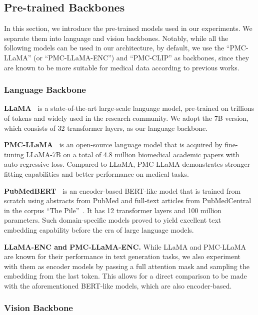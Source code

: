 \documentclass{article}
\begin{document}
\subsection{Pre-trained Backbones}
\label{sec:Pre-trained Models}

In this section, we introduce the pre-trained models used in our experiments. We separate them into language and vision backbones. Notably, while all the following models can be used in our architecture, by default, 
we use the ``PMC-LLaMA'' (or ``PMC-LLaMA-ENC'') and ``PMC-CLIP'' as backbones, since they are known to be more suitable for medical data according to previous works.


\subsubsection{Language Backbone}
\vspace{3pt}
\noindent \textbf{LLaMA~\cite{touvron2023llama}} is a state-of-the-art large-scale language model, pre-trained on trillions of tokens and widely used in the research community. 
We adopt the 7B version, which consists of 32 transformer layers, as our language backbone.

\noindent \textbf{PMC-LLaMA~\cite{wu2023pmcllama}} is an open-source language model that is acquired by fine-tuning LLaMA-7B on a total of 4.8 million biomedical academic papers with auto-regressive loss. Compared to LLaMA, PMC-LLaMA demonstrates stronger fitting capabilities and better performance on medical tasks. 



\noindent \textbf{PubMedBERT~\cite{gu2021domain}} is an encoder-based BERT-like model that is trained from scratch using abstracts from PubMed and full-text articles from PubMedCentral in the corpus ``The Pile''~\cite{pile}. It has 12 transformer layers and 100 million parameters. Such domain-specific models proved to yield excellent text embedding capability before the era of large language models.

\noindent \textbf{LLaMA-ENC and PMC-LLaMA-ENC.} While LLaMA and PMC-LLaMA are known for their performance in text generation tasks, we also experiment with them as encoder models by passing a full attention mask and sampling the embedding from the last token. This allows for a direct comparison to be made with the aforementioned BERT-like models, which are also encoder-based.

\subsubsection{Vision Backbone}
\end{document}
